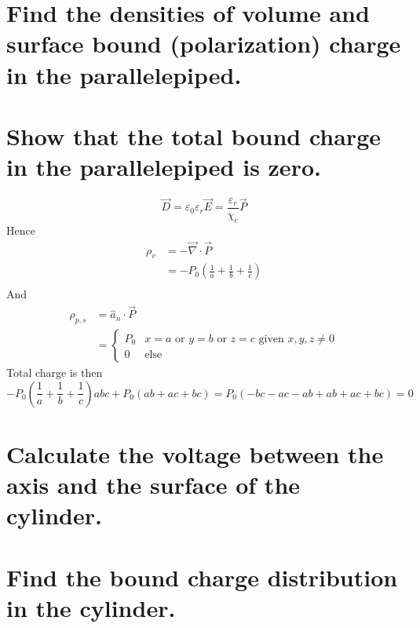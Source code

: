 \documentclass[answers]{exam}
\begin{document}
\begin{questions}
\begin{parts}
	\part{Find the densities of volume and surface bound (polarization) charge in the parallelepiped.}
	\part{Show that the total bound charge in the parallelepiped is zero.}
\end{parts}

\begin{solution}
	$$\vec{D} = \varepsilon_0\varepsilon_r\vec{E} = \frac{\varepsilon_r}{\chi_e}\vec{P}$$
	Hence
	\begin{align*}
		\rho_v &= -\vec{\nabla}\cdot\vec{P} \\
		       &= -P_0\left(\frac{1}{a} + \frac{1}{b} + \frac{1}{c}\right) \\
	\end{align*}
	And
	\begin{align*}
		\rho_{p,s} &= \hat{a}_n \cdot \vec{P} \\
			   &= \begin{cases} P_0 & x=a \text{ or } y=b \text{ or } z=c \text{ given } x,y,z \neq 0 \\ 0 & \text{else} \end{cases}
	\end{align*}
	Total charge is then
	$$-P_0\left(\frac{1}{a} + \frac{1}{b} + \frac{1}{c}\right)abc + P_0(ab + ac + bc) = P_0(-bc-ac-ab+ab+ac+bc) = 0$$
\end{solution}


\begin{parts}
	\part{Calculate the voltage between the axis and the surface of the cylinder.}
	\part{Find the bound charge distribution in the cylinder.}
\end{parts}


\end{questions}
\end{document}
